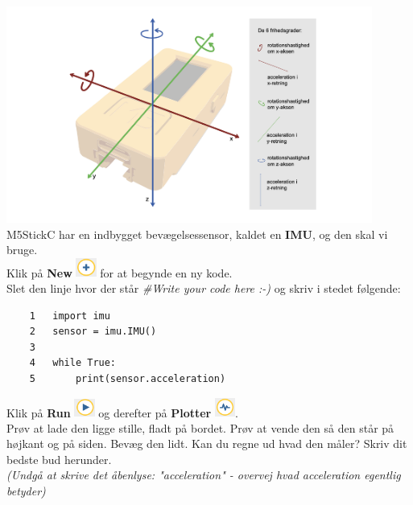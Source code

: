\documentclass{ucph-handout}
\begin{document}
\begin{exercisebox}[adjusted title=Bevægelsessensor]
\includegraphics[width=0.9\textwidth]{billeder/aaccel.png}\\
M5StickC har en indbygget bevægelsessensor, kaldet en \textbf{IMU}, og den skal vi bruge. \\
Klik på \textbf{New} \includegraphics[width=0.05\textwidth]{ikoner/new.png} for at begynde en ny kode. \\

Slet den linje hvor der står \textit{\#Write your code here :-)} og skriv i stedet følgende:
\begin{verbatim}
    1   import imu
    2   sensor = imu.IMU()
    3
    4   while True:
    5       print(sensor.acceleration)
\end{verbatim}

Klik på \textbf{Run} \includegraphics[width=0.05\textwidth]{ikoner/run.png} og derefter på \textbf{Plotter}  \includegraphics[width=0.05\textwidth]{ikoner/poltter.png}.\\

Prøv at lade den ligge stille, fladt på bordet. Prøv at vende den så den står på højkant og på siden. Bevæg den lidt. Kan du regne ud hvad den måler? Skriv dit bedste bud herunder. \\
\textit{(Undgå at skrive det åbenlyse: "acceleration" - overvej hvad acceleration egentlig betyder)}\\\\


\end{exercisebox}
\end{document}
